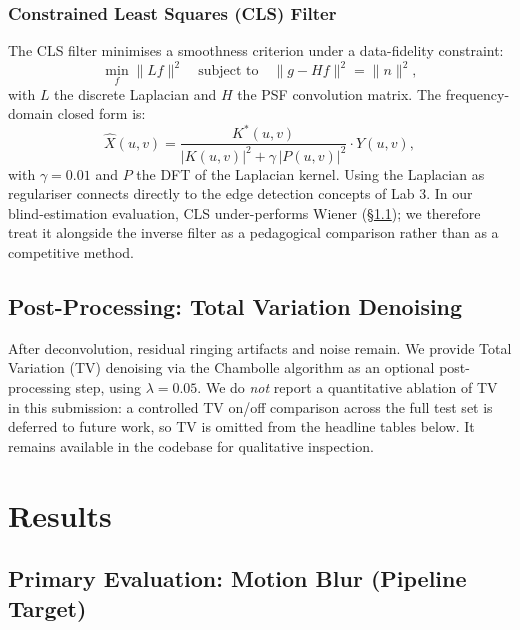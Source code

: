 \documentclass[12pt,a4paper]{article}
\begin{document}
\subsubsection{Constrained Least Squares (CLS) Filter}

The CLS filter minimises a smoothness criterion under a data-fidelity
constraint:
\begin{equation}
  \min_f \|Lf\|^2 \quad \text{subject to} \quad \|g - Hf\|^2 = \|n\|^2,
\end{equation}
with $L$ the discrete Laplacian and $H$ the PSF convolution matrix.
The frequency-domain closed form is:
\begin{equation}
  \hat{X}(u,v) = \frac{K^*(u,v)}{|K(u,v)|^2 + \gamma\,|P(u,v)|^2} \cdot Y(u,v),
  \label{eq:cls}
\end{equation}
with $\gamma = 0.01$ and $P$ the DFT of the Laplacian kernel. Using the
Laplacian as regulariser connects directly to the edge detection
concepts of Lab 3. In our blind-estimation evaluation, CLS
under-performs Wiener (\S\ref{sec:primary}); we therefore treat it
alongside the inverse filter as a pedagogical comparison rather than as
a competitive method.

\subsection{Post-Processing: Total Variation Denoising}

After deconvolution, residual ringing artifacts and noise remain. We
provide Total Variation (TV) denoising via the Chambolle algorithm
\cite{chambolle2004} as an optional post-processing step, using
$\lambda = 0.05$. We do \textit{not} report a quantitative ablation of
TV in this submission: a controlled TV on/off comparison across the full
test set is deferred to future work, so TV is omitted from the headline
tables below. It remains available in the codebase for qualitative
inspection.

\section{Results}

\subsection{Primary Evaluation: Motion Blur (Pipeline Target)}
\label{sec:primary}
\end{document}
